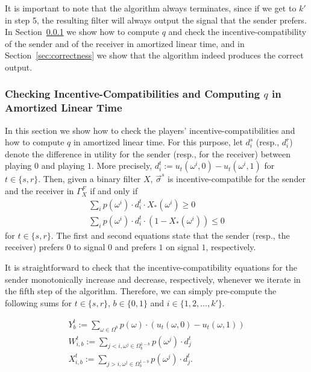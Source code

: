 \documentclass[submission,copyright,creativecommons]{eptcs}
\begin{document}
It is important to note that the algorithm always terminates, since if we get to $k'$ in step 5, the resulting filter will always output the signal that the sender prefers. In Section~\ref{sec:amortized} we show how to compute $q$ and check the incentive-compatibility of the sender and of the receiver in amortized linear time, and in Section~\ref{sec:correctness} we show that the algorithm indeed produces the correct output.

\subsubsection{Checking Incentive-Compatibilities and Computing $q$ in Amortized Linear Time}\label{sec:amortized}

In this section we show how to check the players' incentive-compatibilities and how to compute $q$ in amortized linear time. For this purpose, let $d_i^s$ (resp., $d_i^r$) denote the difference in utility for the sender (resp., for the receiver) between playing $0$ and playing $1$. More precisely, $d_i^t := u_t(\omega^i, 0) - u_t(\omega^i, 1)$ for $t \in \{s,r\}$. Then, given a binary filter $X$, $\vec{\sigma}^s$ is incentive-compatible for the sender and the receiver in $\Gamma^F_X$ if and only if 
\begin{equation}\label{eq:ic-s}
\begin{array}{ll}
\sum_i p(\omega^i) \cdot d_i^t \cdot X_*(\omega^i) \ge 0\\
\sum_i p(\omega^i) \cdot d_i^t \cdot (1 - X_*(\omega^i)) \le 0
\end{array}
\end{equation}
for $t \in \{s, r\}$. The first and second equations state that the sender (resp., the receiver) prefers $0$ to signal $0$ and prefers $1$ on signal $1$, respectively.

It is straightforward to check that the incentive-compatibility equations for the sender monotonically increase and decrease, respectively, whenever we iterate in the fifth step of the algorithm. Therefore, we can simply pre-compute the following sums 
for $t \in \{s,r\}$, $b \in \{0,1\}$ and $i \in \{1,2,\ldots, k'\}$. 

$$\begin{array}{l}
Y_b^t := \sum_{\omega \in \Omega^b} p(\omega) \cdot (u_t(\omega, 0) - u_t(\omega,1))\\
W_{i,b}^{t} := \sum_{j < i, \omega^j \in \Omega_b^{1-b}} p(\omega^j) \cdot d_j^t\\
X_{i,b}^{t} := \sum_{j > i, \omega^j \in \Omega_b^{1-b}} p(\omega^j) \cdot d_j^t.
\end{array}$$
\end{document}
